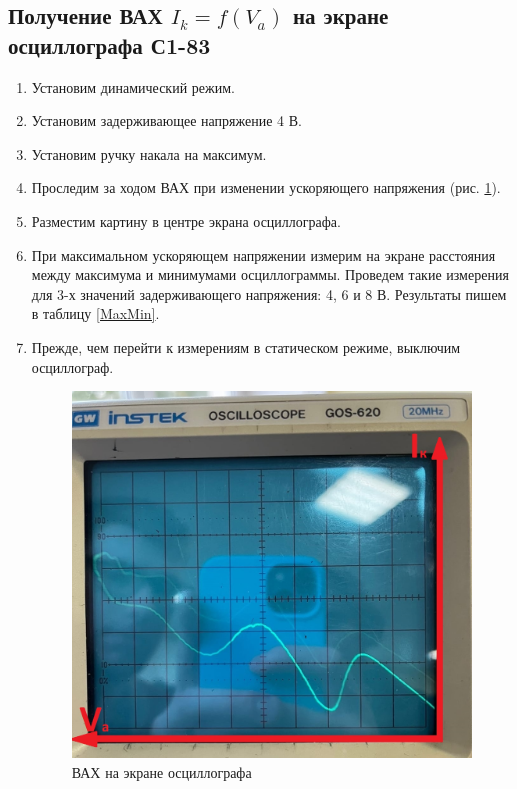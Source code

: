  	\subsection*{Получение ВАХ $I_k = f(V_a)$ на экране осциллографа С1-83}

 
 	\begin{enumerate}
 		\item Установим динамический режим.
 		
 		\item Установим задерживающее напряжение 4 В.
 		
 		\item Установим ручку накала на максимум.
 		
 		\item Проследим за ходом ВАХ при изменении ускоряющего напряжения (рис. \ref{Dynamic}).
 		
 		\item Разместим картину в центре экрана осциллографа.
 		
 		\item При максимальном ускоряющем напряжении измерим на экране расстояния между максимума и минимумами осциллограммы. Проведем такие измерения для 3-х значений задерживающего напряжения: 4, 6 и 8 В. Результаты пишем в таблицу \ref{MaxMin}.
 		
 		\item Прежде, чем перейти к измерениям в статическом режиме, выключим осциллограф.
 		
 		\newpage
 		
 		\begin{figure}[h!]
 			\centering
 			\includegraphics[width=\linewidth]{./Pictures/Pic1.jpg}
 			\caption{ВАХ на экране осциллографа}
 			\label{Dynamic}
 		\end{figure}
 	\end{enumerate}
 

